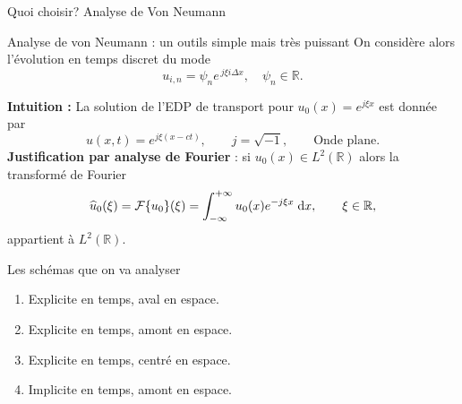 \documentclass[aspectratio=169, french]{beamer}
\newcommand{\bbR}{\mathbb{R}}
\begin{document}
\begin{frame}{Quoi choisir? Analyse de Von Neumann}
	\begin{block}{Analyse de von Neumann : un outils simple mais très puissant}
		On considère alors l'évolution en temps discret du mode
		\begin{equation*}
			u_{i, n} = \psi_n e^{\, j \xi  i  \Delta x}, \quad \psi_n \in \bbR.
		\end{equation*}
	\end{block}
	\textbf{Intuition : } La solution de l'EDP de transport pour $u_0(x) = e^{j \xi x}$ est donnée par  
	\begin{equation*}
	u(x, t) = e^{j \xi(x-ct)}, \qquad j = \sqrt{-1}, \qquad \text{Onde plane.}
	\end{equation*}
	\textbf{Justification par analyse de Fourier} : si $u_0(x) \in L^2(\bbR)$ alors
	la transformé de Fourier
	\begin{equation*}
		\widehat{u}_0(\xi) = \mathcal{F}\{u_0\}(\xi) = \int_{-\infty}^{+\infty} u_0(x)e^{- j \xi x}  \d{x}, \qquad \xi \in \bbR,
	\end{equation*}
appartient à $L^2(\bbR)$. 
\end{frame}

\begin{frame}{Les schémas que on va analyser}
\begin{enumerate}
	\item Explicite en temps, aval en espace.
	\item Explicite en temps, amont en espace.
	\item Explicite en temps, centré en espace.
	\item Implicite en temps, amont en espace.
\end{enumerate}
\end{frame}
\end{document}
